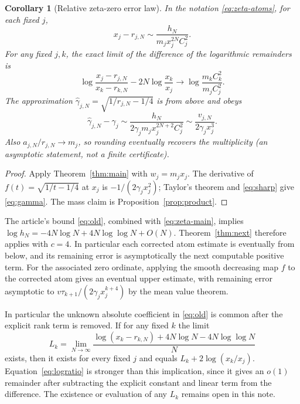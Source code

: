 \documentclass[11pt]{article}
\newtheorem{corollary}[theorem]{Corollary}
\theoremstyle{remark}\newtheorem{remark}[theorem]{Remark}
\begin{document}
\begin{corollary}[Relative zeta-zero error law]\label{cor:zeta}
In the notation \eqref{eq:zeta-atoms}, for each fixed $j$,
\begin{equation}\label{eq:zeta-main}
 x_j-r_{j,N}\sim\frac{h_N}{m_j x_j^{2N}C_j^2}.
\end{equation}
For any fixed $j,k$, the exact limit of the difference of the logarithmic remainders is
\begin{equation}\label{eq:logratio}
 \log\frac{x_j-r_{j,N}}{x_k-r_{k,N}}-2N\log\frac{x_k}{x_j}
 \longrightarrow\log\frac{m_kC_k^2}{m_jC_j^2}.
\end{equation}
The approximation $\widehat\gamma_{j,N}=\sqrt{1/r_{j,N}-1/4}$ is from above and obeys
\begin{equation}\label{eq:gamma}
 \widehat\gamma_{j,N}-\gamma_j\sim
 \frac{h_N}{2\gamma_jm_j x_j^{2N+2}C_j^2}
 \sim\frac{v_{j,N}}{2\gamma_j x_j^3}.
\end{equation}
Also $a_{j,N}/r_{j,N}\to m_j$, so rounding eventually recovers the multiplicity (an asymptotic statement, not a finite certificate).
\end{corollary}
\begin{proof}
Apply Theorem~\ref{thm:main} with $w_j=m_jx_j$. The derivative of $f(t)=\sqrt{1/t-1/4}$ at $x_j$ is $-1/(2\gamma_jx_j^2)$; Taylor's theorem and \eqref{eq:sharp} give \eqref{eq:gamma}. The mass claim is Proposition~\ref{prop:product}.
\end{proof}

The article's bound \eqref{eq:old}, combined with \eqref{eq:zeta-main}, implies $\log h_N=-4N\log N+4N\log\log N+O(N)$. Theorem~\ref{thm:next} therefore applies with $c=4$. In particular each corrected atom estimate is eventually from below, and its remaining error is asymptotically the next computable positive term. For the associated zero ordinate, applying the smooth decreasing map $f$ to the corrected atom gives an eventual upper estimate, with remaining error asymptotic to $v\tau_{k+1}/(2\gamma_j x_j^{k+4})$ by the mean value theorem.

In particular the unknown absolute coefficient in \eqref{eq:old} is common after the explicit rank term is removed. If for any fixed $k$ the limit
\[
 L_k=\lim_{N\to\infty}\frac{\log(x_k-r_{k,N})+4N\log N-4N\log\log N}{N}
\]
exists, then it exists for every fixed $j$ and equals $L_k+2\log(x_k/x_j)$. Equation~\eqref{eq:logratio} is stronger than this implication, since it gives an $o(1)$ remainder after subtracting the explicit constant and linear term from the difference. The existence or evaluation of any $L_k$ remains open in this note.
\end{document}
